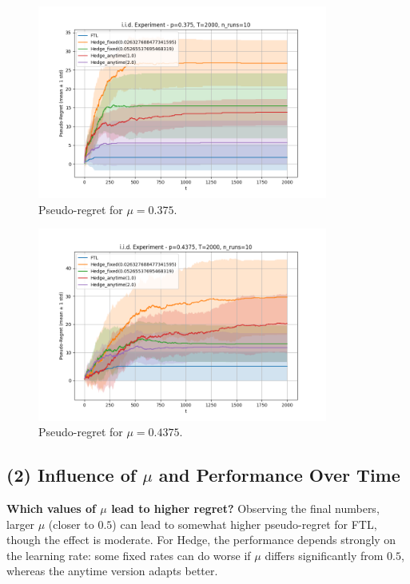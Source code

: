 \begin{figure}[H]
\centering
\includegraphics[width=0.85\textwidth]{Code/plot_iid_0375.png}
\caption{Pseudo-regret for \(\mu=0.375\).}
\label{fig:plot_mu0375}
\end{figure}

\begin{figure}[H]
\centering
\includegraphics[width=0.85\textwidth]{Code/plot_iid_04375.png}
\caption{Pseudo-regret for \(\mu=0.4375\).}
\label{fig:plot_mu04375}
\end{figure}

\subsection{(2) Influence of \texorpdfstring{$\mu$}{mu} and Performance Over Time}

\textbf{Which values of \(\mu\) lead to higher regret?}  
Observing the final numbers, larger \(\mu\) (closer to \(0.5\)) can lead to somewhat higher pseudo-regret for FTL, though the effect is moderate.  For Hedge, the performance depends strongly on the learning rate: some fixed rates can do worse if \(\mu\) differs significantly from \(0.5\), whereas the anytime version adapts better.  

